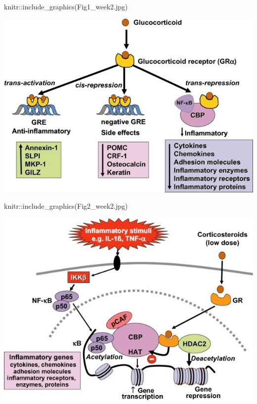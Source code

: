 \documentclass[
]{article}
\newenvironment{Shaded}{\begin{snugshade}}{\end{snugshade}}
\newcommand{\FunctionTok}[1]{\textcolor[rgb]{0.00,0.00,0.00}{#1}}
\newcommand{\NormalTok}[1]{#1}
\newcommand{\SpecialCharTok}[1]{\textcolor[rgb]{0.00,0.00,0.00}{#1}}
\newcommand{\StringTok}[1]{\textcolor[rgb]{0.31,0.60,0.02}{#1}}
\begin{document}
\begin{Shaded}
\begin{Highlighting}[]
\NormalTok{knitr}\SpecialCharTok{::}\FunctionTok{include\_graphics}\NormalTok{(}\StringTok{\textquotesingle{}Fig1\_week2.jpg\textquotesingle{}}\NormalTok{)}
\end{Highlighting}
\end{Shaded}

\includegraphics[width=9.33in]{Fig1_week2}

\begin{Shaded}
\begin{Highlighting}[]
\NormalTok{knitr}\SpecialCharTok{::}\FunctionTok{include\_graphics}\NormalTok{(}\StringTok{\textquotesingle{}Fig2\_week2.jpg\textquotesingle{}}\NormalTok{)}
\end{Highlighting}
\end{Shaded}

\includegraphics[width=8.44in]{Fig2_week2}
\end{document}
